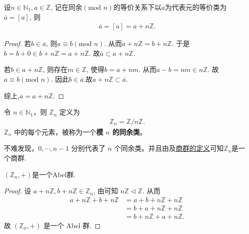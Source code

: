\documentclass[../../main.tex]{subfiles}
\begin{document}
\begin{proposition}\label{proposition:模n同余等价类就是nZ}
设$n \in \mathbb{N}_1, a \in \mathbb{Z}$, 记在同余$(\mathrm{mod}\,\,n)$的等价关系下以$a$为代表元的等价类为$\overline{a} = [a]$, 则
\begin{align*}
\overline{a} = [a] = a + n\mathbb{Z}.
\end{align*}
\end{proposition}
\begin{proof}
若$b \in \overline{a}$, 则$a \equiv b (\mathrm{mod}\,\,n)$. 从而$a + n\mathbb{Z} = b + n\mathbb{Z}$. 于是$b = b + 0 \in b + n\mathbb{Z} = a + n\mathbb{Z}$. 故$\overline{a} \subset a + n\mathbb{Z}$.

若$b \in a + n\mathbb{Z}$, 则存在$m \in \mathbb{Z}$, 使得$b = a + nm$. 从而$a - b = nm \in n\mathbb{Z}$. 故$a \equiv b (\mathrm{mod}\,\,n)$. 因此$b \in \overline{a}$.故$ a + n\mathbb{Z}\subset \overline{a}$.

综上,$\overline{a} = a + n\mathbb{Z}$.
\end{proof}

\begin{definition}[模 $n$ 的同余类]
令 $n\in \mathbb{N}_1$，则 $\mathbb{Z}_n$ 定义为
\begin{align*}
\mathbb{Z}_n=\mathbb{Z}/n\mathbb{Z}.
\end{align*}
$\mathbb{Z}_n$ 中的每个元素，被称为一个\textbf{模 $n$ 的同余类}。
\end{definition}
\begin{note}
不难发现，$0,\cdots,n - 1$ 分别代表了 $n$ 个同余类。并且由及\hyperref[proposition:商群]{商群的定义}可知$\mathbb{Z}_n$是一个商群.
\end{note}

\begin{proposition}\label{proposition:Z_n是一个Abel群}
$(\mathbb{Z}_n,+)$是一个Abel群.
\end{proposition}
\begin{proof}
设 $a+n\mathbb{Z} ,b+n\mathbb{Z} \in \mathbb{Z} _n$, 由可知 $n\mathbb{Z} \lhd \mathbb{Z}$. 从而
\begin{align*}
a+n\mathbb{Z} +b+n\mathbb{Z} &=a+b+n\mathbb{Z} +n\mathbb{Z} \\
&=b+a+n\mathbb{Z} +n\mathbb{Z} \\
&=b+n\mathbb{Z} +a+n\mathbb{Z} .
\end{align*}
故 $(\mathbb{Z} _n,+)$ 是一个 Abel 群.
\end{proof}
\end{document}
